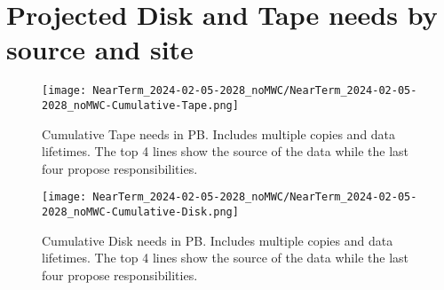 \section{Projected Disk and Tape needs by source and site}
\begin{figure}[h]
\centering\texttt{[image: NearTerm\_2024-02-05-2028\_noMWC/NearTerm\_2024-02-05-2028\_noMWC-Cumulative-Tape.png]}
\caption{Cumulative Tape needs in PB. Includes multiple copies and data lifetimes. The top 4 lines show the source of the data while the last four propose responsibilities.}
\label{fig:Cumulative-Tape}
\end{figure}
\begin{figure}[h]
\centering\texttt{[image: NearTerm\_2024-02-05-2028\_noMWC/NearTerm\_2024-02-05-2028\_noMWC-Cumulative-Disk.png]}
\caption{Cumulative Disk needs in PB. Includes multiple copies and data lifetimes. The top 4 lines show the source of the data while the last four propose responsibilities.}
\label{fig:Cumulative-Disk}
\end{figure}
